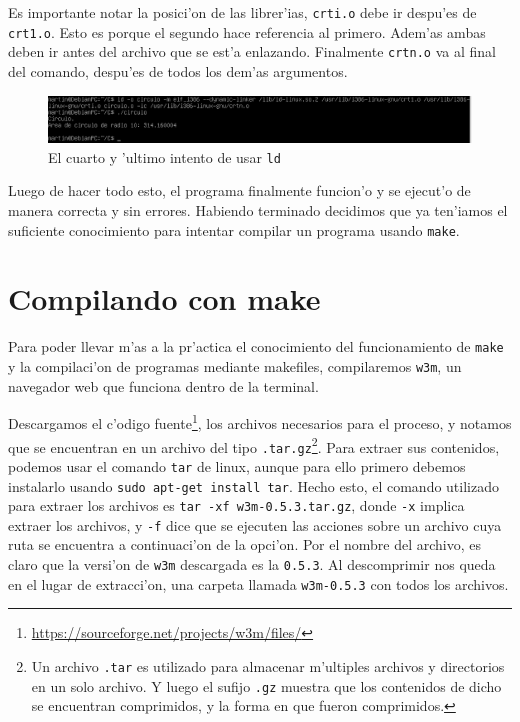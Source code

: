 \documentclass[11pt]{article}
\begin{document}
		Es importante notar la posici'on de las librer'ias, \texttt{crti.o} debe ir despu'es de \texttt{crt1.o}. Esto es porque el segundo hace referencia al primero. Adem'as ambas deben ir antes del archivo que se est'a enlazando. Finalmente \texttt{crtn.o} va al final del comando, despu'es de todos los dem'as argumentos.
		
		\begin{figure}[H]
			\centering
			\includegraphics[width=.9\linewidth]{Images/Seccion 1/S1 parte nueve.PNG}
			\caption{El cuarto y 'ultimo intento de usar \texttt{ld}}
			\label{fig:fourth-ld-attempt}
		\end{figure}
		
		Luego de hacer todo esto, el programa finalmente funcion'o y se ejecut'o de manera correcta y sin errores. Habiendo terminado decidimos que ya ten'iamos el suficiente conocimiento para intentar compilar un programa usando \texttt{make}.
		
		
	\section{Compilando con make}
	
	Para poder llevar m'as a la pr'actica el conocimiento del funcionamiento de \texttt{make} y la compilaci'on de programas mediante makefiles, compilaremos \texttt{w3m}, un navegador web que funciona dentro de la terminal.
	
	Descargamos el c'odigo fuente\footnote{\url{https://sourceforge.net/projects/w3m/files/}}, los archivos necesarios para el proceso, y notamos que se encuentran en un archivo del tipo \texttt{.tar.gz}\footnote{Un archivo \texttt{.tar} es utilizado para almacenar m'ultiples archivos y directorios en un solo archivo. Y luego el sufijo \texttt{.gz} muestra que los contenidos de dicho se encuentran comprimidos, y la forma en que fueron comprimidos.}. Para extraer sus contenidos, podemos usar el comando \texttt{tar} de linux, aunque para ello primero debemos instalarlo usando \texttt{sudo apt-get install tar}. Hecho esto, el comando utilizado para extraer los archivos es \texttt{tar -xf w3m-0.5.3.tar.gz}, donde \texttt{-x} implica extraer los archivos, y \texttt{-f} dice que se ejecuten las acciones sobre un archivo cuya ruta se encuentra a continuaci'on de la opci'on. Por el nombre del archivo, es claro que la versi'on de \texttt{w3m} descargada es la \texttt{0.5.3}. Al descomprimir nos queda en el lugar de extracci'on, una carpeta llamada \texttt{w3m-0.5.3} con todos los archivos.
	
\end{document}
